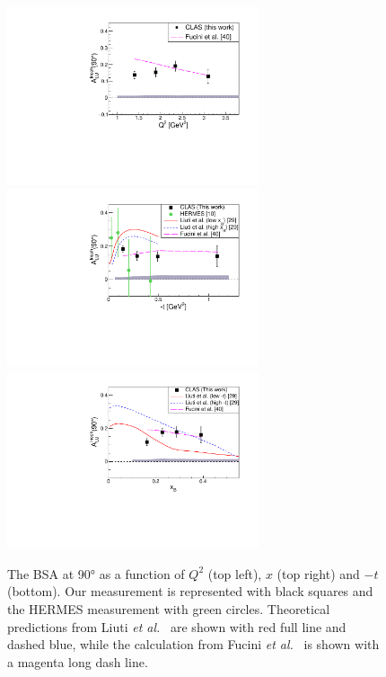 \documentclass{article}
\begin{document}
\begin{figure}[tbp!]
\center
\includegraphics[width=7.4cm]{fig3/ALU_90_p_vs_Q2_shortscenrario.pdf}
\includegraphics[width=7.4cm]{fig3/ALU_90_p_vs_t_shortscenrario.pdf}
\includegraphics[width=7.4cm]{fig3/ALU_90_p_vs_x_shortscenrario.pdf}
	\caption{The BSA at 90° as a function of  $Q^2$ (top left), $x$ (top right) and 
	$-t$ (bottom). Our measurement is represented with black squares and the HERMES 
	measurement \cite{Airapetian:2009cga} with green circles. Theoretical predictions 
	from Liuti {\it et al.}~\cite{Liuti:2005gi,GonzalezHernandez:2012jv} are shown 
	with red full line and dashed blue, while the calculation from Fucini 
	{\it et al.}~\cite{Fucini:2019xlc} is shown with a magenta long dash line.}
\label{fig:IncALU}
\end{figure}
\end{document}
